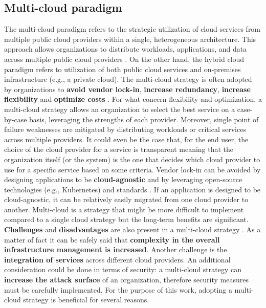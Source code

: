 \subsection{Multi-cloud paradigm}

The multi-cloud paradigm refers to the strategic utilization of cloud services from multiple public cloud providers within a single, heterogeneous architecture. 
This approach allows organizations to distribute workloads, applications, and data across multiple public cloud providers \cite{google_multicloud}.
On the other hand, the hybrid cloud paradigm refers to utilization of both public cloud services and on-premises infrastructure (e.g., a private cloud).
The multi-cloud strategy is often adopted by organizations to \textbf{avoid vendor lock-in}, \textbf{increase redundancy}, \textbf{increase flexibility} and \textbf{optimize costs} \cite{google_multicloud}.
For what concern flexibility and optimization, a multi-cloud strategy allows an organization to select the best service on a case-by-case basis, leveraging the strengths of each provider.
Moreover, single point of failure weaknesses are mitigated by distributing workloads or critical services across multiple providers.
It could even be the case that, for the end user, the choice of the cloud provider for a service is transparent meaning that the organization itself (or the system) is the one that decides which cloud provider to use for a specific service based on some criteria.
Vendor lock-in can be avoided by designing applications to be \textbf{cloud-agnostic} and by leveraging open-source technologies (e.g., Kubernetes) and standards \cite{google_multicloud}.
If an application is designed to be cloud-agnostic, it can be relatively easily migrated from one cloud provider to another.
Multi-cloud is a strategy that might be more difficult to implement compared to a single cloud strategy but the long-term benefits are significant.
\textbf{Challenges} and \textbf{disadvantages} are also present in a multi-cloud strategy \cite{google_multicloud}.
As a matter of fact it can be safely said that \textbf{complexity in the overall infrastructure management is increased}.
Another challenge is the \textbf{integration of services} across different cloud providers.
An additional consideration could be done in terms of security: a multi-cloud strategy can \textbf{increase the attack surface} of an organization, therefore security measures must be carefully implemented.
\newline
For the purpose of this work, adopting a multi-cloud strategy is beneficial for several reasons.
